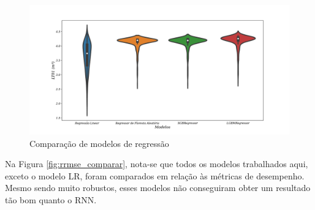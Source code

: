 \begin{figure}[!htb]
	\centering
	\caption{Comparação de modelos de regressão}\label{fig:violin-lr-xgb-lgbm-rf}
	\includegraphics[width=1\linewidth]{Resultados/Figuras/violin-LR-XGB-LGBM-RF}
	
\end{figure}


Na Figura \ref{fig:rrmse_comparar}, nota-se que todos os modelos trabalhados aqui, exceto o modelo LR, foram comparados em relação às métricas de desempenho. Mesmo sendo muito robustos, esses modelos não conseguiram obter um resultado tão bom quanto o RNN.

